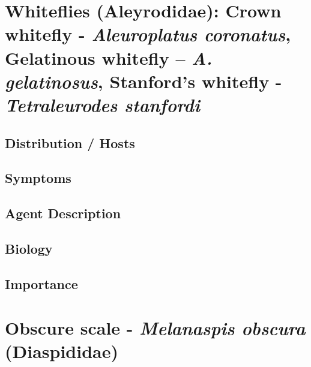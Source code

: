 \documentclass[
]{book}
\begin{document}
\section*{\texorpdfstring{Whiteflies (Aleyrodidae): Crown whitefly - \emph{Aleuroplatus coronatus}, Gelatinous whitefly -- \emph{A. gelatinosus}, Stanford's whitefly - \emph{Tetraleurodes stanfordi}}{Whiteflies (Aleyrodidae): Crown whitefly - Aleuroplatus coronatus, Gelatinous whitefly -- A. gelatinosus, Stanford's whitefly - Tetraleurodes stanfordi}}\label{whiteflies-aleyrodidae-crown-whitefly---aleuroplatus-coronatus-gelatinous-whitefly-a.-gelatinosus-stanfords-whitefly---tetraleurodes-stanfordi}

\subsection*{Distribution / Hosts}\label{distribution-hosts-9}

\subsection*{Symptoms}\label{symptoms-9}

\subsection*{Agent Description}\label{agent-description-9}

\subsection*{Biology}\label{biology-9}

\subsection*{Importance}\label{importance-9}

\section*{\texorpdfstring{Obscure scale - \emph{Melanaspis obscura} (Diaspididae)}{Obscure scale - Melanaspis obscura (Diaspididae)}}\label{obscure-scale---melanaspis-obscura-diaspididae}
\end{document}
